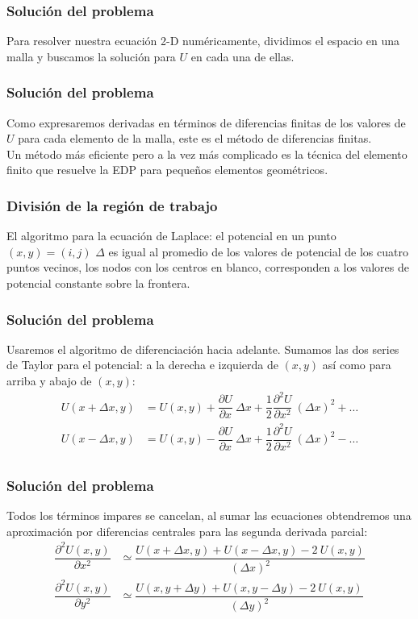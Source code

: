 \begin{frame}
\frametitle{Solución del problema}
Para resolver nuestra ecuación 2-D numéricamente, dividimos el espacio en una malla y buscamos la solución para $U$ en cada una de ellas.
\end{frame}
\begin{frame}
\frametitle{Solución del problema}
Como expresaremos derivadas en términos de diferencias finitas de los valores de $U$ para cada elemento de la malla, este es el método de diferencias finitas.
\\
\bigskip
Un método más eficiente pero a la vez más complicado es la técnica del elemento finito que resuelve la EDP para pequeños elementos geométricos.
\end{frame}
\begin{frame}
\frametitle{División de la región de trabajo}
El algoritmo para la ecuación de Laplace: el potencial en un punto $(x,y) = (i,j)$ $\Delta$ es igual al promedio de los valores de potencial de los cuatro puntos vecinos, los nodos con los centros en blanco, corresponden a los valores de potencial constante sobre la frontera.
\end{frame}
{
\begin{frame}[plain]
\begin{figure}
	\centering
	
\end{figure}
\end{frame}
}
\begin{frame}
\frametitle{Solución del problema}
Usaremos el algoritmo de diferenciación hacia adelante. Sumamos las dos series de Taylor para el potencial: a la derecha e izquierda de $(x,y)$ así como para arriba y abajo de $(x,y)$:
\fontsize{12}{12}\selectfont
\begin{align*}
U(x + \Delta x,y) &= U(x, y) + \dfrac{\partial U}{\partial x} \: \Delta x + \dfrac{1}{2} \dfrac{\partial^{2} U}{\partial x^{2}} \: (\Delta x)^{2} + \ldots \\
U(x - \Delta x,y) &= U(x,y) - \dfrac{\partial U}{\partial x} \: \Delta x + \dfrac{1}{2} \dfrac{\partial^{2} U}{\partial x^{2}} \: (\Delta x)^{2} - \ldots \\
\end{align*}
\end{frame}
\begin{frame}
\frametitle{Solución del problema}
Todos los términos impares se cancelan, al sumar las ecuaciones obtendremos una aproximación por diferencias centrales para las segunda derivada parcial:
\fontsize{12}{12}\selectfont
\begin{align*}
\dfrac{\partial^{2} U(x,y)}{\partial x^{2}} &\simeq \dfrac{U(x+\Delta x, y) + U(x-\Delta x,y)-2 \: U(x,y)}{(\Delta x)^{2}} \\
\dfrac{\partial^{2} U(x,y)}{\partial y^{2}} &\simeq \dfrac{U(x, y+\Delta y) + U(x,y-\Delta y)-2 \: U(x,y)}{(\Delta y)^{2}}
\end{align*}
\end{frame}
